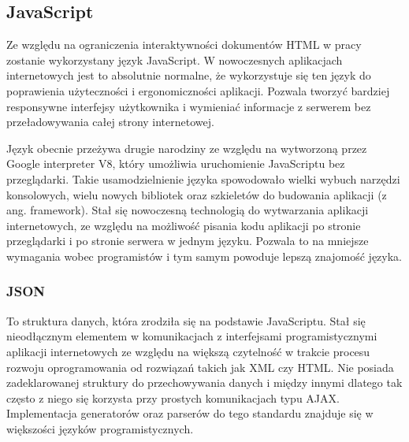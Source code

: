 \subsection{JavaScript}
Ze względu na ograniczenia interaktywności dokumentów HTML w pracy zostanie wykorzystany język JavaScript. W nowoczesnych aplikacjach internetowych jest to absolutnie normalne, że wykorzystuje się ten język do poprawienia użyteczności i ergonomiczności aplikacji. Pozwala tworzyć bardziej responsywne interfejsy użytkownika i wymieniać informacje z serwerem bez przeładowywania całej strony internetowej.

Język obecnie przeżywa drugie narodziny ze względu na wytworzoną przez Google interpreter V8, który umożliwia uruchomienie JavaScriptu bez przeglądarki. Takie usamodzielnienie języka spowodowało wielki wybuch narzędzi konsolowych, wielu nowych bibliotek oraz szkieletów do budowania aplikacji (z ang. framework). Stał się nowoczesną technologią do wytwarzania aplikacji internetowych, ze względu na możliwość pisania kodu aplikacji po stronie przeglądarki i po stronie serwera w jednym języku. Pozwala to na mniejsze wymagania wobec programistów i tym samym powoduje lepszą znajomość języka.



\subsubsection{JSON}
To struktura danych, która zrodziła się na podstawie JavaScriptu.\cite{JsonWiki} Stał się nieodłącznym elementem w komunikacjach z interfejsami programistycznymi aplikacji internetowych ze względu na większą czytelność w trakcie procesu rozwoju oprogramowania od rozwiązań takich jak XML czy HTML. Nie posiada zadeklarowanej struktury do przechowywania danych i między innymi dlatego tak często z niego się korzysta przy prostych komunikacjach typu AJAX. Implementacja generatorów oraz parserów do tego standardu znajduje się w większości języków programistycznych.


